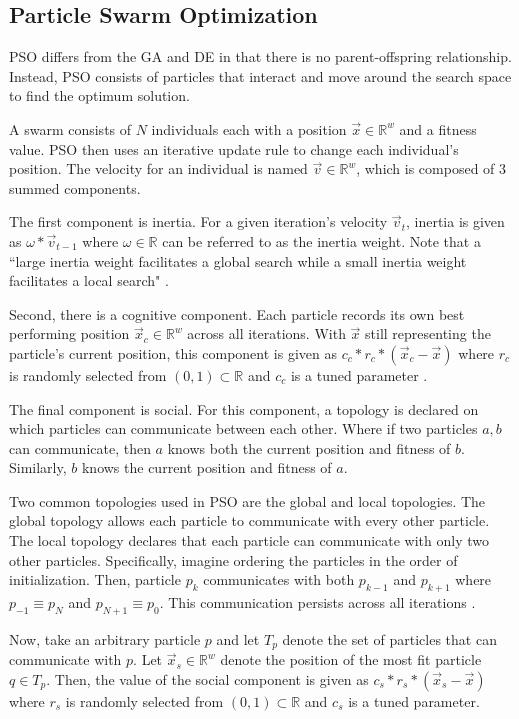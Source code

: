\documentclass[twoside,11pt]{article}
\newcommand{\Rw}{\mathbb{R}^w }
\begin{document}
\subsection{Particle Swarm Optimization}

	PSO differs from the GA and DE in that there is no parent-offspring relationship. Instead, PSO consists of particles that interact and move around the search space to find the optimum solution.

	A swarm consists of $N$ individuals each with a position $\vec{x} \in \Rw$ and a fitness value.
	PSO then uses an iterative update rule to change each individual's position. The velocity for an individual is named $\vec{v} \in \Rw$, which is composed of 3 summed components.

	The first component is inertia. For a given iteration's velocity $\vec{v}_t$, inertia is given as $\omega * \vec{v}_{t-1}$ where $\omega \in \mathbb{R}$ can be referred to as the inertia weight. Note that a ``large inertia weight facilitates a global search while a small inertia weight facilitates a local search" \citep{empirical-pso}.

	Second, there is a cognitive component.
	Each particle records its own best performing position $\vec{x}_c \in \Rw$ across all iterations.
	With $\vec{x}$ still representing the particle's current position, this component is given as $c_c * r_c * (\vec{x}_c - \vec{x})$ where $r_c$ is randomly selected from $(0,1) \subset \mathbb{R}$ and $c_c$ is a tuned parameter \citep{og-pso}.

	The final component is social.
	For this component, a topology is declared on which particles can communicate between each other.
	Where if two particles $a,b$ can communicate, then $a$ knows both the current position and fitness of $b$.
	Similarly, $b$ knows the current position and fitness of $a$.

	Two common topologies used in PSO are the global and local topologies.
	The global topology allows each particle to communicate with every other particle.
	The local topology declares that each particle can communicate with only two other particles.
	Specifically, imagine ordering the particles in the order of initialization.
	Then, particle $p_k$ communicates with both $p_{k-1}$ and $p_{k+1}$ where $p_{-1} \equiv p_N$ and $p_{N+1} \equiv p_{0}$.
	This communication persists across all iterations \citep{og-pso}.

	Now, take an arbitrary particle $p$ and let $T_p$ denote the set of particles that can communicate with $p$.
	Let $\vec{x}_s \in \Rw$ denote the position of the most fit particle $q \in T_p$. Then, the value of the social component is given as $c_s * r_s * (\vec{x}_s - \vec{x})$ where $r_s$ is randomly selected from $(0,1) \subset \mathbb{R}$ and $c_s$ is a tuned parameter.
\end{document}
